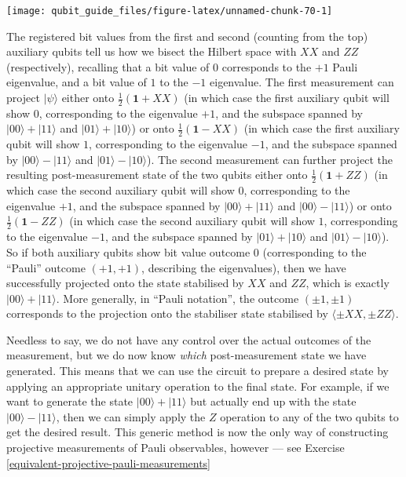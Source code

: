 \documentclass[fleqn]{article}
\begin{document}
\begin{center}\texttt{[image: qubit\_guide\_files/figure-latex/unnamed-chunk-70-1]} \end{center}

The registered bit values from the first and second (counting from the top) auxiliary qubits tell us how we bisect the Hilbert space with \(XX\) and \(ZZ\) (respectively), recalling that a bit value of \(0\) corresponds to the \(+1\) Pauli eigenvalue, and a bit value of \(1\) to the \(-1\) eigenvalue.
The first measurement can project \(|\psi\rangle\) either onto \(\frac{1}{2}(\mathbf{1}+XX)\) (in which case the first auxiliary qubit will show \(0\), corresponding to the eigenvalue \(+1\), and the subspace spanned by \(|00\rangle+|11\rangle\) and \(|01\rangle+|10\rangle\)) or onto \(\frac{1}{2}(\mathbf{1}-XX)\) (in which case the first auxiliary qubit will show \(1\), corresponding to the eigenvalue \(-1\), and the subspace spanned by \(|00\rangle-|11\rangle\) and \(|01\rangle-|10\rangle\)).
The second measurement can further project the resulting post-measurement state of the two qubits either onto \(\frac{1}{2}(\mathbf{1}+ZZ)\) (in which case the second auxiliary qubit will show \(0\), corresponding to the eigenvalue \(+1\), and the subspace spanned by \(|00\rangle+|11\rangle\) and \(|00\rangle-|11\rangle\)) or onto \(\frac{1}{2}(\mathbf{1}-ZZ)\) (in which case the second auxiliary qubit will show \(1\), corresponding to the eigenvalue \(-1\), and the subspace spanned by \(|01\rangle+|10\rangle\) and \(|01\rangle-|10\rangle\)).
So if both auxiliary qubits show bit value outcome \(0\) (corresponding to the ``Pauli'' outcome \((+1,+1)\), describing the eigenvalues), then we have successfully projected onto the state stabilised by \(XX\) and \(ZZ\), which is exactly \(|00\rangle+|11\rangle\).
More generally, in ``Pauli notation'', the outcome \((\pm1,\pm1)\) corresponds to the projection onto the stabiliser state stabilised by \(\langle\pm XX,\pm ZZ\rangle\).

Needless to say, we do not have any control over the actual outcomes of the measurement, but we do now know \emph{which} post-measurement state we have generated.
This means that we can use the circuit to prepare a desired state by applying an appropriate unitary operation to the final state.
For example, if we want to generate the state \(|00\rangle+|11\rangle\) but actually end up with the state \(|00\rangle-|11\rangle\), then we can simply apply the \(Z\) operation to any of the two qubits to get the desired result.
This generic method is now the only way of constructing projective measurements of Pauli observables, however --- see Exercise \ref{equivalent-projective-pauli-measurements}
\end{document}
